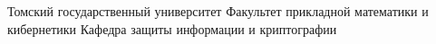 \documentclass[12pt]{article}
\begin{document}
	Томский государственный университет
	\newline
	Факультет прикладной математики и кибернетики
	\newline
	Кафедра защиты информации и криптографии
\end{document}
